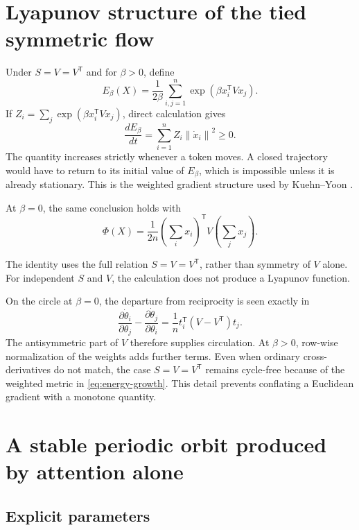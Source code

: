 \documentclass[11pt,a4paper]{article}
\theoremstyle{definition}
\newcommand{\T}{\mathsf T}
\newcommand{\norm}[1]{\left\lVert #1\right\rVert}
\begin{document}
\section{Lyapunov structure of the tied symmetric flow}
\label{sec:no-cycle}

Under $S=V=V^{\T}$ and for $\beta>0$, define
\begin{equation}
 E_\beta(X)=\frac{1}{2\beta}\sum_{i,j=1}^n
 \exp\!\left(\beta x_i^{\T}Vx_j\right).                   \label{eq:energy}
\end{equation}
If $Z_i=\sum_j\exp(\beta x_i^{\T}Vx_j)$, direct calculation gives
\begin{equation}
 \frac{dE_\beta}{dt}=\sum_{i=1}^n Z_i\norm{\dot x_i}^2\geq0.  \label{eq:energy-growth}
\end{equation}
The quantity increases strictly whenever a token moves. A closed trajectory would have
to return to its initial value of $E_\beta$, which is impossible unless it is already
stationary. This is the weighted gradient structure used by Kuehn--Yoon
\cite{kuehnyoon2026spectral}.

At $\beta=0$, the same conclusion holds with
\[
 \Phi(X)=\frac{1}{2n}\left(\sum_i x_i\right)^{\T}
 V\left(\sum_jx_j\right).
\]

The identity uses the full relation $S=V=V^{\T}$, rather than symmetry of $V$ alone.
For independent $S$ and $V$, the calculation does not produce a Lyapunov function.

On the circle at $\beta=0$, the departure from reciprocity is seen exactly in
\begin{equation}
 \frac{\partial\dot\theta_i}{\partial\theta_j}
 -\frac{\partial\dot\theta_j}{\partial\theta_i}
 =\frac1n t_i^{\T}(V-V^{\T})t_j.                          \label{eq:curl}
\end{equation}
The antisymmetric part of $V$ therefore supplies circulation. At $\beta>0$, row-wise
normalization of the weights adds further terms. Even when ordinary cross-derivatives
do not match, the case $S=V=V^{\T}$ remains cycle-free because of the weighted metric
in \eqref{eq:energy-growth}. This detail prevents conflating a Euclidean gradient with
a monotone quantity.

\section{A stable periodic orbit produced by attention alone}
\label{sec:cycle-experiment}

\subsection{Explicit parameters}
\end{document}
